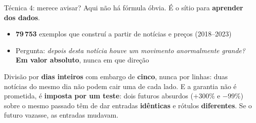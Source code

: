 \documentclass[aspectratio=169]{beamer}
\begin{document}
\begin{frame}{Técnica 4: merece avisar?}
Aqui não há fórmula óbvia. É o sítio para \textbf{aprender dos dados}.
\vspace{3mm}
\begin{itemize}
  \item \textbf{79\,753} exemplos que construí a partir de notícias e preços (2018--2023)
  \item Pergunta: \emph{depois desta notícia houve um movimento anormalmente grande?}
        \textbf{Em valor absoluto}, nunca em que direção
\end{itemize}
\vspace{1mm}

\centering
{}
\vspace{3mm}

\raggedright\footnotesize
Divisão por \textbf{dias inteiros} com embargo de \textbf{cinco}, nunca por linhas: duas notícias
do mesmo dia não podem cair uma de cada lado. E a garantia não é prometida, é \textbf{imposta por
um teste}: dois futuros absurdos ($+300\%$ e $-99\%$) sobre o mesmo passado têm de dar entradas
\textbf{idênticas} e rótulos \textbf{diferentes}. Se o futuro vazasse, as entradas mudavam.
\end{frame}
\end{document}
